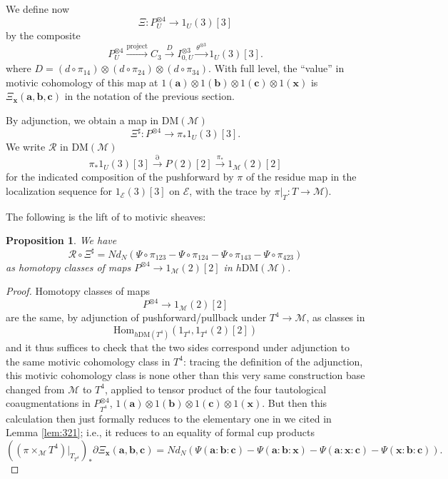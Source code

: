 \documentclass[a4paper,reqno,11pt]{amsart}
\theoremstyle{plain}
\newtheorem{proposition}[theorem]{Proposition}
\theoremstyle{definition}
\theoremstyle{remark}
\newcommand{\DM}{\mathrm{DM}}
\newcommand{\Hom}{\mathrm{Hom}}
\begin{document}
We define now
\[
\Xi: P^{\otimes 4}_U \to 1_{U}(3)[3]
\]
by the composite
\[
P^{\otimes 4}_U \xrightarrow{\mathrm{project}} C_3 \xrightarrow{D} I^{\otimes 3}_{0,U} \xrightarrow{\theta^{\otimes 3}} 1_U(3)[3].
\]
where $D=(d\circ \pi_{14}) \otimes (d\circ \pi_{24}) \otimes (d\circ \pi_{34})$. With full level, the ``value'' in motivic cohomology of this map at $1(\mathbf{a})\otimes 1(\mathbf{b})\otimes 1(\mathbf{c}) \otimes 1(\mathbf{x})$ is $\Xi_{\mathbf{x}}(\mathbf{a},\mathbf{b}, \mathbf{c})$ in the notation of the previous section. 

By adjunction, we obtain a map in $\DM(\mathcal{M})$
\[
\Xi^\sharp: P^{\otimes 4} \to \pi_*1_U(3)[3].
\]
We write $\mathcal{R}$ in $\DM(\mathcal{M})$
\[
\pi_*1_U(3)[3] \xrightarrow{\partial} P(2)[2] \xrightarrow{\pi_*} 1_{\mathcal{M}}(2)[2]
\]
for the indicated composition of the pushforward by $\pi$ of the residue map in the localization sequence for $1_\mathcal{E}(3)[3]$ on $\mathcal{E}$, with the trace by $\pi|_T:T\to \mathcal{M}$).

The following is the lift of \cite[Lemma 3.2.1]{BPPS} to motivic sheaves:
\begin{proposition}
We have
\[
    \mathcal{R}\circ \Xi^\sharp = Nd_N (\Psi \circ \pi_{123} - \Psi \circ \pi_{124}-\Psi \circ \pi_{143}-\Psi \circ \pi_{423})
\]  
as homotopy classes of maps $P^{\otimes 4}\to 1_{\mathcal{M}}(2)[2]$ in $h\DM(\mathcal{M})$.
\end{proposition}
\begin{proof}
Homotopy classes of maps
\[
P^{\otimes 4}\to 1_{\mathcal M}(2)[2]
\]
are the same, by adjunction of pushforward/pullback under $T^4\to \mathcal{M}$, as classes in
\[
\Hom_{h\DM(T^4)}(1_{T^4},1_{T^4}(2)[2])
\]
and it thus suffices to check that the two sides correspond under adjunction to the same motivic cohomology class in $T^4$: tracing the definition of the adjunction, this motivic cohomology class is none other than this very same construction base changed from $\mathcal{M}$ to $T^4$, applied to tensor product of the four tautological coaugmentations in $P_{T^4}^{\otimes 4}$, $1(\mathbf a)\otimes 1(\mathbf b) \otimes 1(\mathbf c)\otimes 1(\mathbf x)$. But then this calculation then just formally reduces to the elementary one in \cite[Lemma 3.2.1]{BPPS} we cited in Lemma \ref{lem:321}; i.e., it reduces to an equality of formal cup products
\[
    ((\pi\times_{\mathcal{M}} T^4)|_{T_{T^4}})_*
    \partial\Xi_{\mathbf{x}}(\mathbf{a},\mathbf{b},\mathbf{c})
    =
    Nd_N(
     \Psi(\mathbf{a}:\mathbf{b}:\mathbf{c})
    -\Psi(\mathbf{a}:\mathbf{b}:\mathbf{x})
    -\Psi(\mathbf{a}:\mathbf{x}:\mathbf{c})
    -\Psi(\mathbf{x}:\mathbf{b}:\mathbf{c})
    ).
\]
\end{proof}
\end{document}
